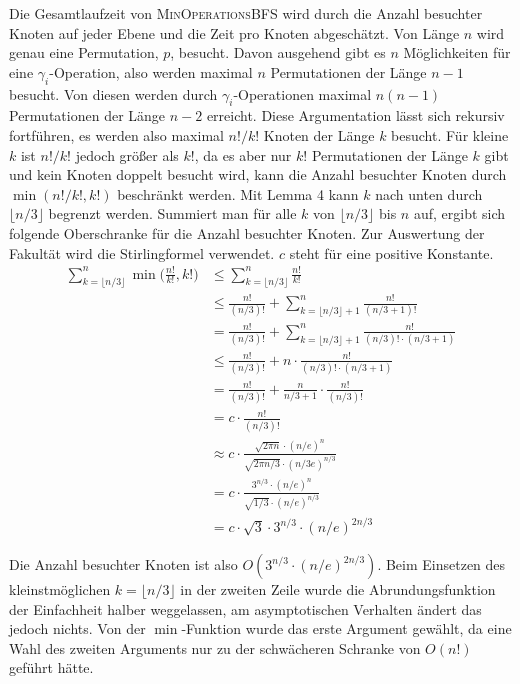 \documentclass[a4paper, 10pt, ngerman]{article}
\begin{document}
Die Gesamtlaufzeit von \textsc{MinOperationsBFS} wird durch die Anzahl besuchter Knoten auf jeder Ebene und die Zeit pro Knoten abgeschätzt. Von Länge $n$ wird genau eine Permutation, $p$, besucht. Davon ausgehend gibt es $n$ Möglichkeiten für eine $\gamma_i$-Operation, also werden maximal $n$ Permutationen der Länge $n - 1$ besucht. Von diesen werden durch $\gamma_i$-Operationen maximal $n(n-1)$ Permutationen der Länge $n - 2$ erreicht. Diese Argumentation lässt sich rekursiv fortführen, es werden also maximal $n! / k!$ Knoten der Länge $k$ besucht. Für kleine $k$ ist $n! / k!$ jedoch größer als $k!$, da es aber nur $k!$ Permutationen der Länge $k$ gibt und kein Knoten doppelt besucht wird, kann die Anzahl besuchter Knoten durch $\min(n! / k!, k!)$ beschränkt werden. Mit Lemma 4 kann $k$ nach unten durch $\lfloor n/3 \rfloor$ begrenzt werden. Summiert man für alle $k$ von $\lfloor n/3 \rfloor$ bis $n$ auf, ergibt sich folgende Oberschranke für die Anzahl besuchter Knoten. Zur Auswertung der Fakultät wird die Stirlingformel verwendet. $c$ steht für eine positive Konstante.
\begin{align*}
    \sum_{k = \lfloor n/3 \rfloor}^n \min \bigg ( \frac {n!}{k!}, k! \bigg )
       & \le \sum_{k = \lfloor n/3 \rfloor}^n \frac {n!} {k!} 
    \\ & \le \frac {n!} {(n/3)!} + \sum_{k = \lfloor n/3 \rfloor + 1}^n \frac {n!} {(n / 3 + 1)!}
    \\ & = \frac {n!} {(n/3)!} + \sum_{k = \lfloor n/3 \rfloor + 1}^n \frac {n!} {(n/3)! \cdot (n / 3 + 1)}
    \\ & \le \frac {n!} {(n/3)!} + n \cdot \frac {n!} {(n/3)! \cdot (n/3 + 1)}
    \\ & = \frac {n!} {(n/3)!} + \frac n {n/3 + 1} \cdot \frac {n!} {(n/3)!}
    \\ & = c \cdot \frac {n!} {(n/3)!}
    \\ & \approx c \cdot
    \frac {\sqrt{2 \pi n} \cdot (n/e)^n} {\sqrt{2 \pi n/3} \cdot (n/3e)^{n/3}}
    \\ & = c \cdot
    \frac {3^{n/3} \cdot (n/e)^n } {\sqrt{1/3} \cdot (n/e)^{n/3}}
    \\ & = c \cdot \sqrt 3 \cdot 3^{n/3} \cdot (n/e)^{2n/3}
\end{align*}

Die Anzahl besuchter Knoten ist also $O(3^{n/3} \cdot (n/e)^{2n/3})$. Beim Einsetzen des kleinstmöglichen $k = \lfloor n/3 \rfloor$ in der zweiten Zeile wurde die Abrundungsfunktion der Einfachheit halber weggelassen, am asymptotischen Verhalten ändert das jedoch nichts. Von der $\min$-Funktion wurde das erste Argument gewählt, da eine Wahl des zweiten Arguments nur zu der schwächeren Schranke von $O(n!)$ geführt hätte.
\end{document}
